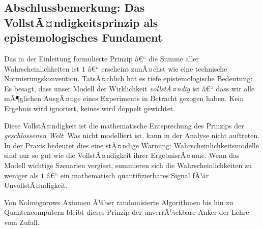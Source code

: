 ﻿\documentclass[12pt,a4paper]{article}
\theoremstyle{definition}
\theoremstyle{plain}
\theoremstyle{remark}
\begin{document}
\subsection{Abschlussbemerkung: Das VollstÃ¤ndigkeitsprinzip als\\ epistemologisches Fundament}

Das in der Einleitung formulierte Prinzip â€“ die Summe aller Wahrscheinlichkeiten
ist $1$ â€“ erscheint zunÃ¤chst wie eine technische Normierungskonvention.
TatsÃ¤chlich hat es tiefe epistemologische Bedeutung: Es besagt, dass unser
Modell der Wirklichkeit \emph{vollstÃ¤ndig} ist â€“ dass wir alle mÃ¶glichen
AusgÃ¤nge eines Experiments in Betracht gezogen haben. Kein Ergebnis wird
ignoriert, keines wird doppelt gewichtet.

Diese VollstÃ¤ndigkeit ist die mathematische Entsprechung des Prinzips der
\emph{geschlossenen Welt}: Was nicht modelliert ist, kann in der Analyse
nicht auftreten. In der Praxis bedeutet dies eine stÃ¤ndige Warnung:
Wahrscheinlichkeitsmodelle sind nur so gut wie die VollstÃ¤ndigkeit
ihrer ErgebnisrÃ¤ume. Wenn das Modell wichtige Szenarien vergisst, summieren
sich die Wahrscheinlichkeiten zu weniger als $1$ â€“ ein mathematisch
quantifizierbares Signal fÃ¼r UnvollstÃ¤ndigkeit.

Von Kolmogorows Axiomen Ã¼ber randomisierte Algorithmen bis hin zu
Quantencomputern bleibt dieses Prinzip der unverrÃ¼ckbare Anker der
Lehre vom Zufall.
\end{document}
